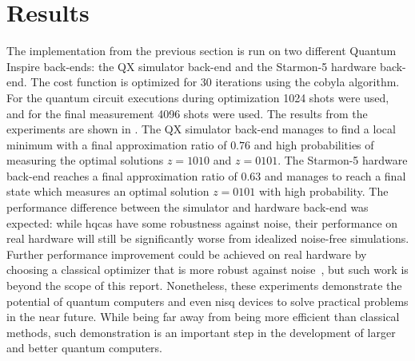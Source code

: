 \section{Results}
The implementation from the previous section is run on two different Quantum Inspire back-ends: the QX simulator back-end and the Starmon-5 hardware back-end.
The cost function is optimized for 30 iterations using the \gls{cobyla} algorithm.
For the quantum circuit executions during optimization 1024 shots were used, and for the final measurement 4096 shots were used.
The results from the experiments are shown in .
The QX simulator back-end manages to find a local minimum with a final approximation ratio of $0.76$ and high probabilities of measuring the optimal solutions $z = 1010$ and $z = 0101$.
The Starmon-5 hardware back-end reaches a final approximation ratio of $0.63$ and manages to reach a final state which measures an optimal solution $z = 0101$ with high probability.
The performance difference between the simulator and hardware back-end was expected: while \glspl{hqca} have some robustness against noise, their performance on real hardware will still be significantly worse from idealized noise-free simulations.
Further performance improvement could be achieved on real hardware by choosing a classical optimizer that is more robust against noise~\cite{lavrijsen2020classical}, but such work is beyond the scope of this report.
Nonetheless, these experiments demonstrate the potential of quantum computers and even \gls{nisq} devices to solve practical problems in the near future.
While being far away from being more efficient than classical methods, such demonstration is an important step in the development of larger and better quantum computers.

